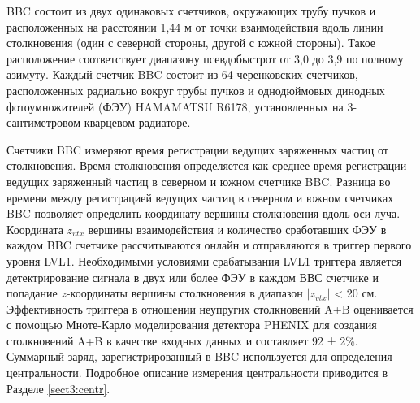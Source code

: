 BBC состоит из двух одинаковых счетчиков, окружающих трубу пучков и расположенных на расстоянии 1,44 м от точки взаимодействия вдоль линии столкновения (один с северной стороны, другой с южной стороны). Такое расположение соответствует диапазону псевдобыстрот от 3,0 до 3,9 по полному азимуту. Каждый счетчик BBC состоит из 64 черенковских счетчиков, расположенных радиально вокруг трубы пучков и однодюймовых динодных фотоумножителей (ФЭУ) HAMAMATSU R6178, установленных на 3-сантиметровом кварцевом радиаторе.

Счетчики BBC измеряют время регистрации ведущих заряженных частиц от столкновения. Время столкновения определяется как среднее время регистрации ведущих заряженный частиц в северном и южном счетчике BBC. 
Разница во времени между регистрацией ведущих частиц в северном и южном счетчиках BBC позволяет определить координату вершины столкновения вдоль оси луча. Координата $z_{vtx}$ вершины взаимодействия и количество сработавших ФЭУ в каждом BBC счетчике рассчитываются онлайн и отправляются в триггер первого уровня LVL1. Необходимыми условиями срабатывания LVL1 триггера является детектрирование сигнала в двух или более ФЭУ в каждом ВВС счетчике и попадание $z$-координаты вершины столкновения в диапазон $|z_{vtx}|$ < 20 см.  Эффективность триггера в отношении неупругих столкновений A+B оценивается с помощью Мноте-Карло моделирования детектора PHENIX для создания столкновений A+B в качестве входных данных и составляет 92 ± 2\%. Суммарный заряд, зарегистрированный в BBC используется для определения центральности. Подробное описание измерения центральности приводится в Разделе \ref{sect3:centr}.

